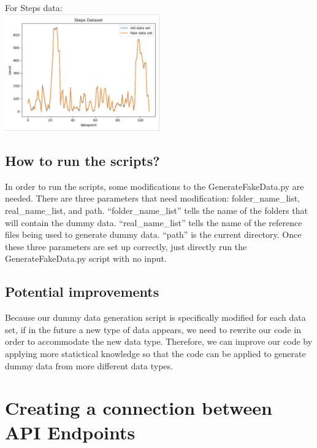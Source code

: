\documentclass[]{book}
\begin{document}
For Steps data:\\
\includegraphics[width=0.5\textwidth,height=\textheight]{./images/Steps Data.JPG}

\hypertarget{how-to-run-the-scripts}{%
\subsection{How to run the scripts?}\label{how-to-run-the-scripts}}

In order to run the scripts, some modifications to the GenerateFakeData.py are needed. There are three parameters that need modification: folder\_name\_list, real\_name\_list, and path. ``folder\_name\_list'' tells the name of the folders that will contain the dummy data. ``real\_name\_list'' tells the name of the reference files being used to generate dummy data. ``path'' is the current directory. Once these three parameters are set up correctly, just directly run the GenerateFakeData.py script with no input.

\hypertarget{potential-improvements}{%
\subsection{Potential improvements}\label{potential-improvements}}

Because our dummy data generation script is specifically modified for each data set, if in the future a new type of data appears, we need to rewrite our code in order to accommodate the new data type. Therefore, we can improve our code by applying more statictical knowledge so that the code can be applied to generate dummy data from more different data types.

\hypertarget{creating-a-connection-between-api-endpoints}{%
\section{Creating a connection between API Endpoints}\label{creating-a-connection-between-api-endpoints}}
\end{document}
